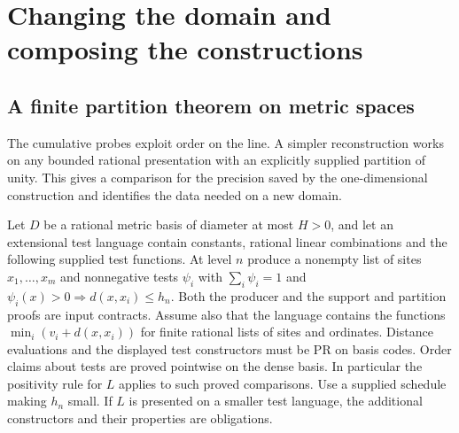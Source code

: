 \section{Changing the domain and composing the constructions}
\label{sec:transfer}

\subsection{A finite partition theorem on metric spaces}

The cumulative probes exploit order on the line. A simpler reconstruction
works on any bounded rational presentation with an explicitly supplied
partition of unity. This gives a comparison for the precision saved by the
one-dimensional construction and identifies the data needed on a new domain.

Let $D$ be a rational metric basis of diameter at most $H>0$, and let an
extensional test language contain constants, rational linear combinations and
the following supplied test functions. At level $n$ produce a nonempty list of
sites $x_1,\ldots,x_m$ and nonnegative tests $\psi_i$ with
$\sum_i\psi_i=1$ and $\psi_i(x)>0\Rightarrow d(x,x_i)\le h_n$.
Both the producer and the support and partition proofs are input contracts.
Assume also that the language contains the functions
$\min_i(v_i+d(x,x_i))$ for finite rational lists of sites and ordinates.
Distance evaluations and the displayed test constructors must be PR on basis
codes. Order claims about tests are proved pointwise on the dense basis.
In particular the positivity rule for $L$ applies to such proved comparisons.
Use a supplied schedule making $h_n$ small. If $L$ is presented on a smaller
test language, the additional constructors and their properties are obligations.

